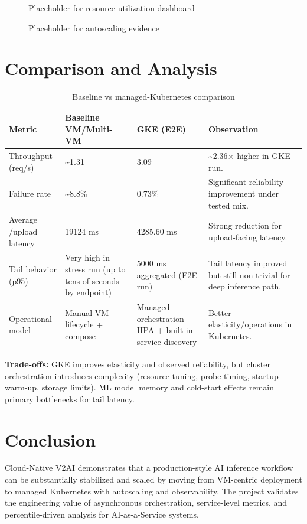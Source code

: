 \documentclass[11pt,a4paper]{article}
\begin{document}
\begin{figure}[H]
\centering
{}
\caption{Placeholder for resource utilization dashboard}
\end{figure}

\begin{figure}[H]
\centering
{}
\caption{Placeholder for autoscaling evidence}
\end{figure}

\section{Comparison and Analysis}
\begin{table}[H]
\centering
\caption{Baseline vs managed-Kubernetes comparison}
\begin{tabular}{p{4.1cm}p{3.0cm}p{3.0cm}p{4.2cm}}
\toprule
\textbf{Metric} & \textbf{Baseline VM/Multi-VM} & \textbf{GKE (E2E)} & \textbf{Observation} \\
\midrule
Throughput (req/s) & \textasciitilde1.31 & 3.09 & \textasciitilde2.36$\times$ higher in GKE run. \\
Failure rate & \textasciitilde8.8\% & 0.73\% & Significant reliability improvement under tested mix. \\
Average /upload latency & 19124 ms & 4285.60 ms & Strong reduction for upload-facing latency. \\
Tail behavior (p95) & Very high in stress run (up to tens of seconds by endpoint) & 5000 ms aggregated (E2E run) & Tail latency improved but still non-trivial for deep inference path. \\
Operational model & Manual VM lifecycle + compose & Managed orchestration + HPA + built-in service discovery & Better elasticity/operations in Kubernetes. \\
\bottomrule
\end{tabular}
\end{table}

\textbf{Trade-offs:} GKE improves elasticity and observed reliability, but cluster orchestration introduces complexity (resource tuning, probe timing, startup warm-up, storage limits). ML model memory and cold-start effects remain primary bottlenecks for tail latency.

\section{Conclusion}
Cloud-Native V2AI demonstrates that a production-style AI inference workflow can be substantially stabilized and scaled by moving from VM-centric deployment to managed Kubernetes with autoscaling and observability. The project validates the engineering value of asynchronous orchestration, service-level metrics, and percentile-driven analysis for AI-as-a-Service systems.
\end{document}
